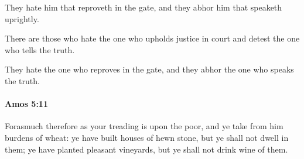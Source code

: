			\begin{versebox}
					\item[BHS] 
					\item[LXX] 
					\item[ASV] They hate him that reproveth in the gate, and they abhor him that speaketh uprightly.
					\item[NIV] There are those who hate the one who upholds justice in court and detest the one who tells the truth.
					\item[NRSV] They hate the one who reproves in the gate, and they abhor the one who speaks the truth.
			\end{versebox}

		\paragraph{Amos 5:11} %
			\label{AMOS-5-11}

			Forasmuch therefore as your treading is upon the poor, and ye take from him burdens of wheat: ye have built houses of hewn stone, but ye shall not dwell in them; ye have planted pleasant vineyards, but ye shall not drink wine of them.

